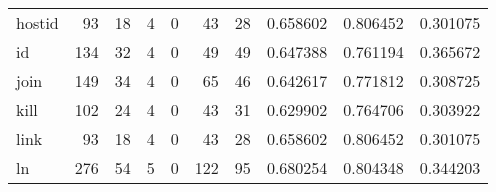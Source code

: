 \begin{tabular}{lrrrrrrrrr}
hostid    &                                                 93 &                                                 18 &                                                  4 &                                                  0 &                                                 43 &                                                 28 &                                           0.658602 &                               0.806452 &                             0.301075 \\
id        &                                                134 &                                                 32 &                                                  4 &                                                  0 &                                                 49 &                                                 49 &                                           0.647388 &                               0.761194 &                             0.365672 \\
join      &                                                149 &                                                 34 &                                                  4 &                                                  0 &                                                 65 &                                                 46 &                                           0.642617 &                               0.771812 &                             0.308725 \\
kill      &                                                102 &                                                 24 &                                                  4 &                                                  0 &                                                 43 &                                                 31 &                                           0.629902 &                               0.764706 &                             0.303922 \\
link      &                                                 93 &                                                 18 &                                                  4 &                                                  0 &                                                 43 &                                                 28 &                                           0.658602 &                               0.806452 &                             0.301075 \\
ln        &                                                276 &                                                 54 &                                                  5 &                                                  0 &                                                122 &                                                 95 &                                           0.680254 &                               0.804348 &                             0.344203 \\

\end{tabular}
